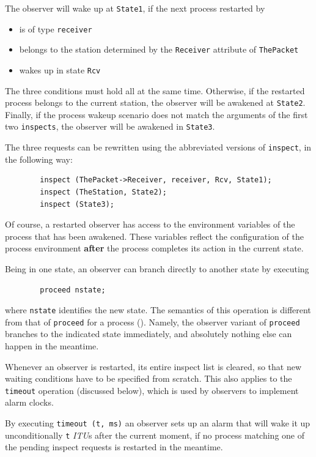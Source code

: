 The observer will wake up at {\tt State1}, if the next process
restarted by \smurph
\begin{itemize}
\item
is of type {\tt receiver}
\item
belongs to the station determined
by the {\tt Receiver} attribute of {\tt ThePacket}
\item
wakes up in state {\tt Rcv}
\end{itemize}
The three conditions must hold all at the same time.
Otherwise, if the restarted process belongs to the
current station, the observer will be awakened at {\tt State2}.
Finally, if the process wakeup scenario does not match
the arguments of the first two {\tt inspects}, the observer will be
awakened in {\tt State3}.

The three requests can be rewritten using the abbreviated versions of
{\tt inspect}, in the following way:
\begin{verbatim}
        inspect (ThePacket->Receiver, receiver, Rcv, State1);
        inspect (TheStation, State2);
        inspect (State3);
\end{verbatim}

\medskip

\noindent
Of course, a restarted observer has access to the environment variables of
the process that has been awakened.
These variables reflect
the configuration of the process environment {\bf after} the process completes
its action in the current state.

Being in one state,
an observer can branch directly to another state by executing
\begin{verbatim}
        proceed nstate;
\end{verbatim}
where {\tt nstate} identifies the new state.
The semantics of this operation is different from that of {\tt proceed}
for a process ().
Namely, the observer variant of
{\tt proceed} branches to the indicated state immediately, and absolutely
nothing else can happen in the meantime.

Whenever an observer is restarted, its entire inspect list is cleared,
so that new waiting conditions have to be specified from scratch.
This also applies to the {\tt timeout} operation (discussed below),
which is used by observers to implement alarm clocks.

By executing
{\tt timeout~(t,~ms)}
an observer sets up an alarm that will wake
it up unconditionally {\tt t} {\em ITU\/}s after the current
moment, if no process matching one of the pending inspect requests
is restarted in the meantime.


